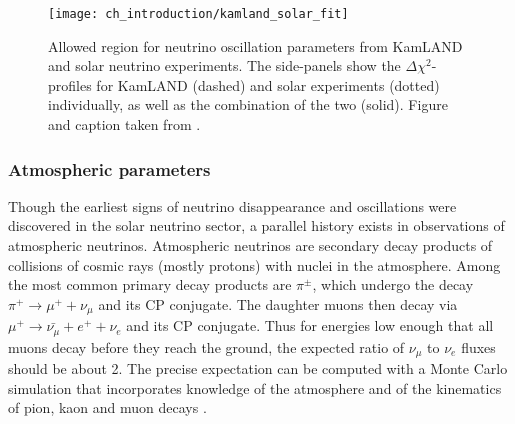 \begin{figure}
    \centering
    \texttt{[image: ch\_introduction/kamland\_solar\_fit]}
    \caption{
        Allowed region for neutrino oscillation parameters from KamLAND and solar
        neutrino experiments.
        The side-panels show the $\Delta \chi^2$-profiles
        for KamLAND (dashed) and solar experiments (dotted) individually,
        as well as the combination of the two (solid).
        Figure and caption taken from \cite{kamland_latest}.
    }
    \label{fig:kamland_plus_solar}
\end{figure}

\subsubsection{Atmospheric parameters}
Though the earliest signs of neutrino disappearance and oscillations
were discovered in the solar neutrino sector,
a parallel history exists in observations of atmospheric neutrinos.
Atmospheric neutrinos are secondary decay products of
collisions of cosmic rays (mostly protons) with nuclei in the atmosphere.
Among the most common primary decay products are $\pi^{\pm}$,
which undergo the decay $\pi^+ \to \mu^+ + \nu_\mu$ and its CP conjugate.
The daughter muons then decay via $\mu^+ \to \bar{\nu_\mu} + e^+ + \nu_e$
and its CP conjugate.
Thus for energies low enough that all muons decay before they reach the ground,
the expected ratio of $\nu_\mu$ to $\nu_e$ fluxes should be about 2.
The precise expectation can be computed with a Monte Carlo simulation
that incorporates knowledge of the atmosphere and of the kinematics of
pion, kaon and muon decays \cite{neutrino_textbook}.

